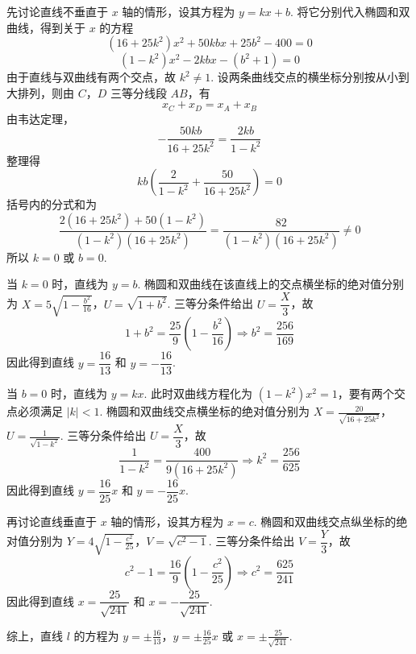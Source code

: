 \begin{solution}
先讨论直线不垂直于 \(x\) 轴的情形，设其方程为 \(y=kx+b\). 将它分别代入椭圆和双曲线，得到关于 \(x\) 的方程
\[
(16+25k^2)x^2+50kbx+25b^2-400=0
\]
\[
(1-k^2)x^2-2kbx-(b^2+1)=0
\]
由于直线与双曲线有两个交点，故 \(k^2\ne1\). 设两条曲线交点的横坐标分别按从小到大排列，则由 \(C\)，\(D\) 三等分线段 \(AB\)，有
\[
x_C+x_D=x_A+x_B
\]
由韦达定理，
\[
-\frac{50kb}{16+25k^2}=\frac{2kb}{1-k^2}
\]
整理得
\[
kb\left(\frac{2}{1-k^2}+\frac{50}{16+25k^2}\right)=0
\]
括号内的分式和为
\[
\frac{2(16+25k^2)+50(1-k^2)}{(1-k^2)(16+25k^2)}=\frac{82}{(1-k^2)(16+25k^2)}\ne0
\]
所以 \(k=0\) 或 \(b=0\).

当 \(k=0\) 时，直线为 \(y=b\). 椭圆和双曲线在该直线上的交点横坐标的绝对值分别为
\(X=5\sqrt{1-\frac{b^2}{16}}\)，\(U=\sqrt{1+b^2}\).
三等分条件给出 \(U=\dfrac{X}{3}\)，故
\[
1+b^2=\frac{25}{9}\left(1-\frac{b^2}{16}\right)\Longrightarrow b^2=\frac{256}{169}
\]
因此得到直线 \(y=\dfrac{16}{13}\) 和 \(y=-\dfrac{16}{13}\).

当 \(b=0\) 时，直线为 \(y=kx\). 此时双曲线方程化为 \((1-k^2)x^2=1\)，要有两个交点必须满足 \(|k|<1\). 椭圆和双曲线交点横坐标的绝对值分别为 \(X=\frac{20}{\sqrt{16+25k^2}}\)，\(U=\frac{1}{\sqrt{1-k^2}}\).
三等分条件给出 \(U=\dfrac{X}{3}\)，故
\[
\frac{1}{1-k^2}=\frac{400}{9(16+25k^2)}\Longrightarrow k^2=\frac{256}{625}
\]
因此得到直线 \(y=\dfrac{16}{25}x\) 和 \(y=-\dfrac{16}{25}x\).

再讨论直线垂直于 \(x\) 轴的情形，设其方程为 \(x=c\). 椭圆和双曲线交点纵坐标的绝对值分别为
\(Y=4\sqrt{1-\frac{c^2}{25}}\)，\(V=\sqrt{c^2-1}\).
三等分条件给出 \(V=\dfrac{Y}{3}\)，故
\[
c^2-1=\frac{16}{9}\left(1-\frac{c^2}{25}\right)\Longrightarrow c^2=\frac{625}{241}
\]
因此得到直线 \(x=\dfrac{25}{\sqrt{241}}\) 和 \(x=-\dfrac{25}{\sqrt{241}}\).

综上，直线 \(l\) 的方程为
\(y=\pm\frac{16}{13}\)，\(y=\pm\frac{16}{25}x\) 或 \(x=\pm\frac{25}{\sqrt{241}}\).
\end{solution}

